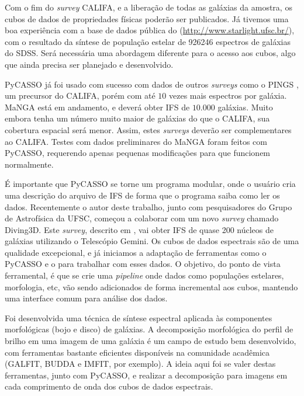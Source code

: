 Com o fim do {\em survey} CALIFA, e a liberação de todas as galáxias da amostra,
os cubos de dados de propriedades físicas poderão ser publicados. Já tivemos uma
boa experiência com a base de dados pública do \starlight
(\url{http://www.starlight.ufsc.br/}), com o resultado da síntese de população
estelar de 926246 espectros de galáxias do SDSS. Será necessária uma abordagem
diferente para o acesso aos cubos, algo que ainda precisa ser planejado e
desenvolvido.

PyCASSO já foi usado com sucesso com dados de outros {\em surveys} como o PINGS
\citep{RosalesOrtega2010}, um precursor do CALIFA, porém com até $10$ vezes mais
espectros por galáxia. MaNGA \citep{Bundy2015} está em andamento, e deverá obter
IFS de $10.000$ galáxias. Muito embora tenha um número muito maior de galáxias
do que o CALIFA, sua cobertura espacial será menor. Assim, estes {\em surveys}
deverão ser complementares ao CALIFA. Testes com dados preliminares do MaNGA
foram feitos com PyCASSO, requerendo apenas pequenas modificações para que funcionem
normalmente.

É importante que PyCASSO se torne um programa modular, onde o usuário cria uma
descrição do arquivo de IFS de forma que o programa saiba como ler os dados.
Recentemente o autor deste trabalho, junto com pesquisadores do Grupo de
Astrofísica da UFSC, começou a colaborar com um novo {\em survey} chamado
Diving3D. Este {\em survey}, descrito em \citet{Ricci2014}, vai obter IFS de
quase 200 núcleos de galáxias utilizando o Telescópio Gemini. Os cubos de dados
espectrais são de uma qualidade excepcional, e já iniciamos a adaptação de
ferramentas como o PyCASSO e o \starlight para trabalhar com esses dados. O
objetivo, do ponto de vista ferramental, é que se crie uma {\em pipeline} onde
dados como populações estelares, morfologia, etc, vão sendo adicionados de forma
incremental aos cubos, mantendo uma interface comum para análise dos dados.

Foi desenvolvida uma técnica de síntese espectral aplicada às componentes
morfológicas (bojo e disco) de galáxias. A decomposição morfológica do perfil de
brilho em uma imagem de uma galáxia é um campo de estudo bem desenvolvido, com
ferramentas bastante eficientes disponíveis na comunidade acadêmica (GALFIT,
BUDDA e IMFIT, por exemplo). A ideia aqui foi se valer destas ferramentas, junto
com PyCASSO, e realizar a decomposição para imagens em cada comprimento de onda
dos cubos de dados espectrais.

